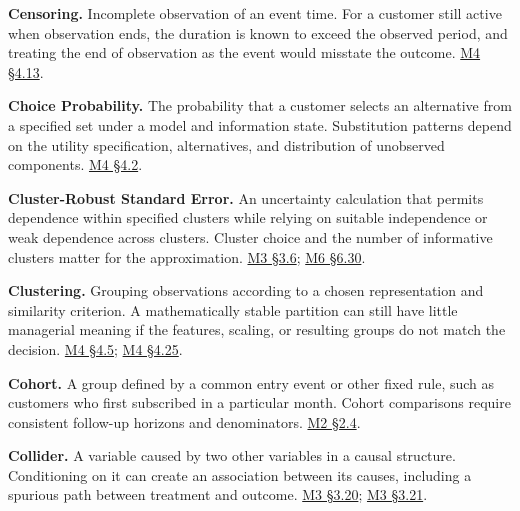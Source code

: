 \noindent\textbf{Censoring.} Incomplete observation of an event time. For a
customer still active when observation ends, the duration is known to
exceed the observed period, and treating the end of observation as the
event would misstate the outcome.
\href{Marketing_Analytics_Lecture_Notes.pdf\#M04-mhealth-time-until-a-logging-gap}{M4
§4.13}.

\noindent\textbf{Choice Probability.} The probability that a customer selects an
alternative from a specified set under a model and information state.
Substitution patterns depend on the utility specification, alternatives,
and distribution of unobserved components.
\href{Marketing_Analytics_Lecture_Notes.pdf\#M04-utility-choice-probabilities-and-willingness-to-pay}{M4
§4.2}.

\noindent\textbf{Cluster-Robust Standard Error.} An uncertainty calculation that
permits dependence within specified clusters while relying on suitable
independence or weak dependence across clusters. Cluster choice and the
number of informative clusters matter for the approximation.
\href{Marketing_Analytics_Lecture_Notes.pdf\#M03-uncertainty-dependence-and-practical-importance}{M3
§3.6};
\href{Marketing_Analytics_Lecture_Notes.pdf\#M06-store-assignment-and-false-discoveries}{M6
§6.30}.

\noindent\textbf{Clustering.} Grouping observations according to a chosen
representation and similarity criterion. A mathematically stable
partition can still have little managerial meaning if the features,
scaling, or resulting groups do not match the decision.
\href{Marketing_Analytics_Lecture_Notes.pdf\#M04-segmentation-begins-with-a-definition-of-similarity}{M4
§4.5};
\href{Marketing_Analytics_Lecture_Notes.pdf\#M04-stable-segments-and-substantive-meaning}{M4
§4.25}.

\noindent\textbf{Cohort.} A group defined by a common entry event or other fixed
rule, such as customers who first subscribed in a particular month.
Cohort comparisons require consistent follow-up horizons and
denominators.
\href{Marketing_Analytics_Lecture_Notes.pdf\#M02-cohorts-retention-and-customer-age}{M2
§2.4}.

\noindent\textbf{Collider.} A variable caused by two other variables in a causal
structure. Conditioning on it can create an association between its
causes, including a spurious path between treatment and outcome.
\href{Marketing_Analytics_Lecture_Notes.pdf\#M03-a-control-variable-needs-a-causal-role}{M3
§3.20};
\href{Marketing_Analytics_Lecture_Notes.pdf\#M03-exact-examples-of-helpful-and-harmful-adjustment}{M3
§3.21}.

